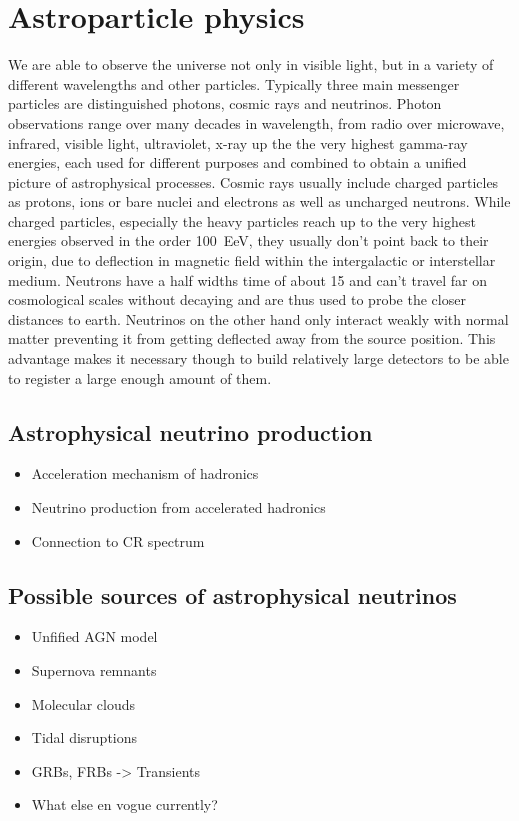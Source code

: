 \chapter{Astroparticle physics}

We are able to observe the universe not only in visible light, but in a variety of different wavelengths and other particles.
Typically three main messenger particles are distinguished photons, cosmic rays and neutrinos.
Photon observations range over many decades in wavelength, from radio over microwave, infrared, visible light, ultraviolet, x-ray up the the very highest gamma-ray energies, each used for different purposes and combined to obtain a unified picture of astrophysical processes.
Cosmic rays usually include charged particles as protons, ions or bare nuclei and electrons as well as uncharged neutrons.
While charged particles, especially the heavy particles reach up to the very highest energies observed in the order \SI{100}{\exa\eV}, they usually don't point back to their origin, due to deflection in magnetic field within the intergalactic or interstellar medium.
Neutrons have a half widths time of about \SI{15}{\min} and can't travel far on cosmological scales without decaying and are thus used to probe the closer distances to earth.
Neutrinos on the other hand only interact weakly with normal matter preventing it from getting deflected away from the source position.
This advantage makes it necessary though to build relatively large detectors to be able to register a large enough amount of them.

\section{Astrophysical neutrino production}
\begin{itemize}
  \item Acceleration mechanism of hadronics
  \item Neutrino production from accelerated hadronics
  \item Connection to CR spectrum
\end{itemize}

\section{Possible sources of astrophysical neutrinos}
\begin{itemize}
  \item Unfified AGN model
  \item Supernova remnants
  \item Molecular clouds
  \item Tidal disruptions
  \item GRBs, FRBs -> Transients
  \item What else en vogue currently?
\end{itemize}